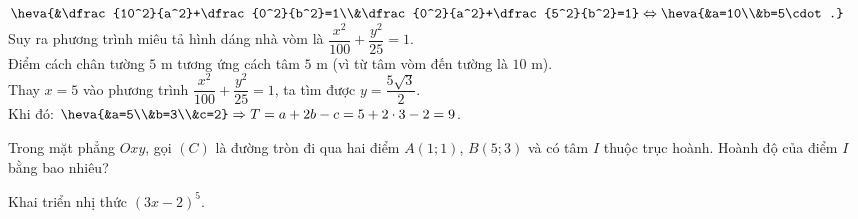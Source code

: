 \begin{ex}
{$\heva{&\dfrac{10^2}{a^2}+\dfrac{0^2}{b^2}=1\\&\dfrac{0^2}{a^2}+\dfrac{5^2}{b^2}=1}\Leftrightarrow\heva{&a=10\\&b=5\cdot.}$ \\
Suy ra phương trình miêu tả hình dáng nhà vòm là $\dfrac{x^2}{100}+\dfrac{y^2}{25}=1$.\\
Điểm cách chân tường $5$ m tương ứng cách tâm $5$ m (vì từ tâm vòm đến tường là $10$ m).\\
Thay $x=5$ vào phương trình $\dfrac{x^2}{100}+\dfrac{y^2}{25}=1$, ta tìm được $y=\dfrac{5\sqrt{3}}{2}$.\\
Khi đó: $\heva{&a=5\\&b=3\\&c=2}\Rightarrow T=a+2b-c=5+2\cdot 3-2=9$.}
\end{ex}

\begin{ex}%
	Trong mặt phẳng $Oxy$, gọi $(C)$ là đường tròn đi qua hai điểm $A( 1;1)$, $B(5;3)$ và có tâm $I$ thuộc trục hoành. Hoành độ của điểm $I$ bằng bao nhiêu? 
\end{ex}


\TL
\begin{ex}
	Khai triển nhị thức $(3x-2)^5$.
\end{ex}

